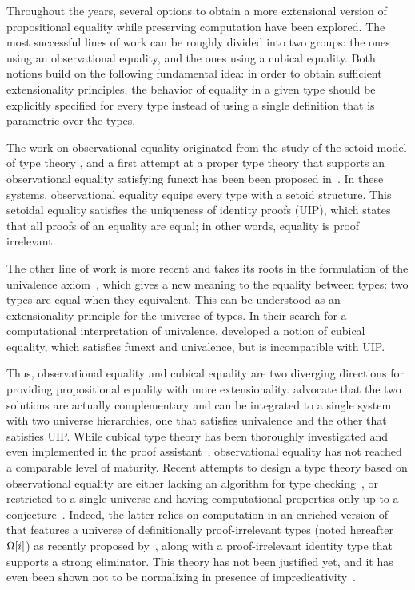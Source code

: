 Throughout the years, several options
to obtain a more extensional version of propositional equality while preserving
computation have been explored. The most successful lines of work can be roughly divided into two
groups: the ones using an observational equality, and the ones using a
cubical equality.
%
Both notions build on the following fundamental idea: in order to obtain
sufficient extensionality principles, the behavior of equality in a given
type should be explicitly specified for every type instead of using a single
definition that is parametric over the types.

The work on observational equality originated from the study of
the setoid model of type theory , and
a first attempt at a proper type theory that supports an observational
equality satisfying funext has been been proposed in~.
%
In these systems, observational equality equips every type with a setoid
structure. This setoidal equality satisfies the uniqueness of identity proofs (UIP),
which states that all proofs of an equality are equal; in other words,
equality is proof irrelevant.

The other line of work is more recent and takes its roots in the
formulation of the univalence axiom~,
which gives a new meaning to the equality between types: two types are
equal when they equivalent. This can be understood as an extensionality
principle for the universe of types.
%
In their search for a computational interpretation of
univalence,  developed a notion of cubical equality,
which satisfies funext and univalence, but is incompatible with UIP.

Thus, observational equality and cubical equality are two diverging
directions for providing propositional equality with more extensionality.
 advocate that the
two solutions are actually complementary and can be integrated to
a single system with two universe hierarchies, one that satisfies
univalence and the other that satisfies UIP.
%
While cubical type theory has been thoroughly investigated and even
implemented in the \Agda proof assistant~,
observational equality has not reached a comparable level of maturity.
%
Recent attempts to design a type theory based on observational equality
are either lacking an algorithm for type checking~, or restricted to a single
universe and having computational properties only up to a
conjecture~. Indeed, the latter relies on computation
in an enriched version of \MLTT that features a universe of definitionally
proof-irrelevant types (noted hereafter $\Omega[i]$) as recently proposed
by~, along with a proof-irrelevant identity type
that supports a strong eliminator. This theory has not been justified yet,
and it has even been shown not to be normalizing in presence of
impredicativity~.

